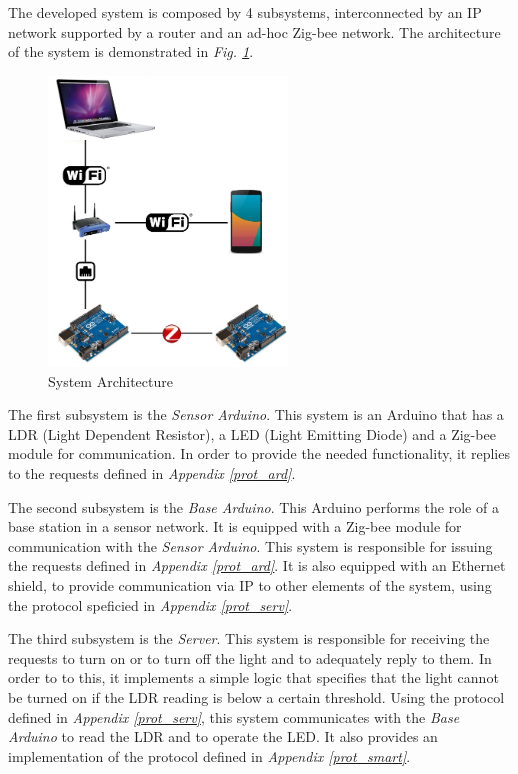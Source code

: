 \documentclass[conference, a4paper]{IEEEtran}
\begin{document}
The developed system is composed by 4 subsystems, interconnected by an IP network supported by a router and an ad-hoc Zig-bee network. The architecture of the system is demonstrated in \textit{Fig. \ref{fig_arch}}.

\begin{figure}[H]
\centering
\includegraphics[width=2.5in]{Architecture}
\caption{System Architecture}
\label{fig_arch}
\end{figure}

The first subsystem is the \textit{Sensor Arduino}. This system is an Arduino that has a LDR (Light Dependent Resistor), a LED (Light Emitting Diode) and a Zig-bee module for communication. In order to provide the needed functionality, it replies to the requests defined in \textit{Appendix \ref{prot_ard}}.

The second subsystem is the \textit{Base Arduino}. This Arduino performs the role of a base station in a sensor network. It is equipped with a Zig-bee module for communication with the \textit{Sensor Arduino}. This system is responsible for issuing the requests defined in \textit{Appendix \ref{prot_ard}}. It is also equipped with an Ethernet shield, to provide communication via IP to other elements of the system, using the protocol speficied in \textit{Appendix \ref{prot_serv}}.

The third subsystem is the \textit{Server}. This system is responsible for receiving the requests to turn on or to turn off the light and to adequately reply to them. In order to to this, it implements a simple logic that specifies that the light cannot be turned on if the LDR reading is below a certain threshold. Using the protocol defined in \textit{Appendix \ref{prot_serv}}, this system communicates with the \textit{Base Arduino} to read the LDR and to operate the LED. It also provides an implementation of the protocol defined in \textit{Appendix \ref{prot_smart}}.
\end{document}

